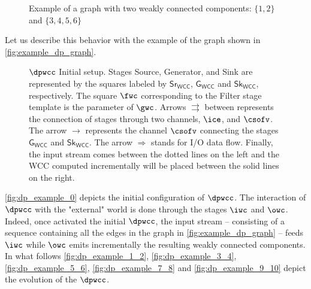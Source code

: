 \begin{figure}
 \begin{center}
\end{center}
\caption[{[PoC] Graph WCC Example}]{Example of a graph with two weakly connected components: $\{1,2\}$ and $\{3,4,5,6\}$}
\label{fig:example_dp_graph}
\end{figure}

Let us describe this behavior with the example of the graph shown in \autoref{fig:example_dp_graph}.

\begin{figure}[h!]
  \centering
{}
\caption[{[PoC] $\dpwcc$ Initial Setup}]{$\dpwcc$ Initial setup. Stages Source, Generator, and Sink are represented by the squares labeled by $\mathsf{Sr_{WCC}}$, $\mathsf{G_{WCC}}$ and $\mathsf{Sk_{WCC}}$, respectively.  The square $\fwc$ corresponding to the Filter stage template is the parameter of $\gwc$. Arrows $\rightrightarrows$ between represents the connection of stages through two channels, $\ice$, and $\csofv$. The arrow  $\rightarrow$ represents the channel $\csofv$ connecting the stages $\mathsf{G_{WCC}}$ and $\mathsf{Sk_{WCC}}$. The arrow $\Longrightarrow$ stands for I/O data flow. Finally, the input stream comes between the dotted lines on the left and the WCC computed incrementally will be placed between the solid lines on the right.}
\label{fig:dp_example_0}
\end{figure}

\autoref{fig:dp_example_0} depicts the initial configuration of $\dpwcc$. 
The interaction of $\dpwcc$ with the "external" world is done through the stages $\iwc$ and $\owc$. 
Indeed, once activated the initial $\dpwcc$, the input stream -- consisting of a sequence containing all the edges in the graph in \autoref{fig:example_dp_graph} -- feeds $\iwc$ while  $\owc$ emits incrementally the resulting weakly connected components.  
In what follows \autoref{fig:dp_example_1_2}, \autoref{fig:dp_example_3_4}, \autoref{fig:dp_example_5_6}, \autoref{fig:dp_example_7_8} and \autoref{fig:dp_example_9_10} depict the evolution of the $\dpwcc$.
 
